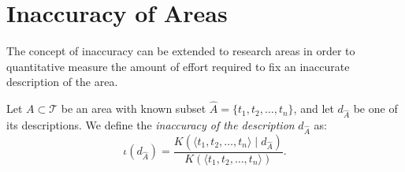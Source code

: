 %
%

\section{Inaccuracy of Areas}

The concept of inaccuracy can be extended to research areas in order to quantitative measure the amount of effort required to fix an inaccurate description of the area.

\begin{definition}
Let $A \subset \mathcal{T}$ be an area with known subset $\hat{A} = \{t_1, t_2, \ldots, t_n\}$, and let $d_{\hat{A}}$ be one of its descriptions. We define the \emph{inaccuracy of the description} $d_{\hat{A}}$ as:
\[
\iota(d_{\hat{A}}) = \frac{ K(\langle t_1, t_2, \ldots, t_n \rangle \mid d_{\hat{A}}) } {K(\langle t_1, t_2, \ldots, t_n \rangle)}.
\]
\end{definition}



